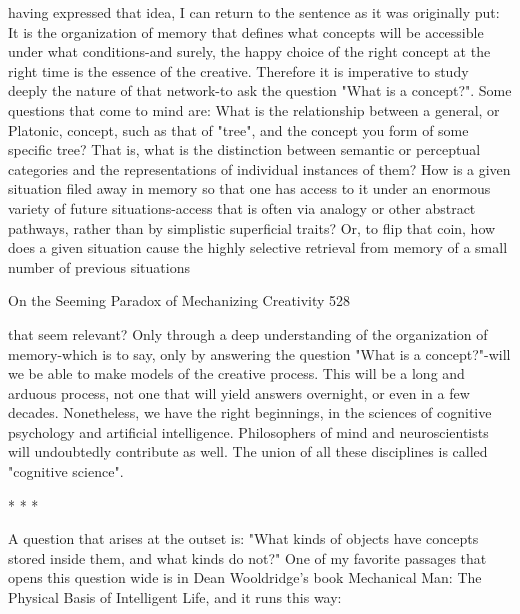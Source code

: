 having expressed that idea, I can return to the sentence as it was originally put: It is
the organization of memory that defines what concepts will be accessible under what
conditions-and surely, the happy choice of the right concept at the right time is the
essence of the creative. Therefore it is imperative to study deeply the nature of that
network-to ask the question "What is a concept?".
        Some questions that come to mind are: What is the relationship between a
general, or Platonic, concept, such as that of "tree", and the concept you form of some
specific tree? That is, what is the distinction between semantic or perceptual
categories and the representations of individual instances of them? How is a given
situation filed away in memory so that one has access to it under an enormous variety
of future situations-access that is often via analogy or other abstract pathways, rather
than by simplistic superficial traits? Or, to flip that coin, how does a given situation
cause the highly selective retrieval from memory of a small number of previous
situations




On the Seeming Paradox of Mechanizing Creativity                                    528

that seem relevant? Only through a deep understanding of the organization of
memory-which is to say, only by answering the question "What is a concept?"-will we
be able to make models of the creative process. This will be a long and arduous
process, not one that will yield answers overnight, or even in a few decades.
Nonetheless, we have the right beginnings, in the sciences of cognitive psychology
and artificial intelligence. Philosophers of mind and neuroscientists will undoubtedly
contribute as well. The union of all these disciplines is called "cognitive science".

                                      *   *   *

        A question that arises at the outset is: "What kinds of objects have concepts
stored inside them, and what kinds do not?" One of my favorite passages that opens
this question wide is in Dean Wooldridge's book Mechanical Man: The Physical Basis
of Intelligent Life, and it runs this way:

